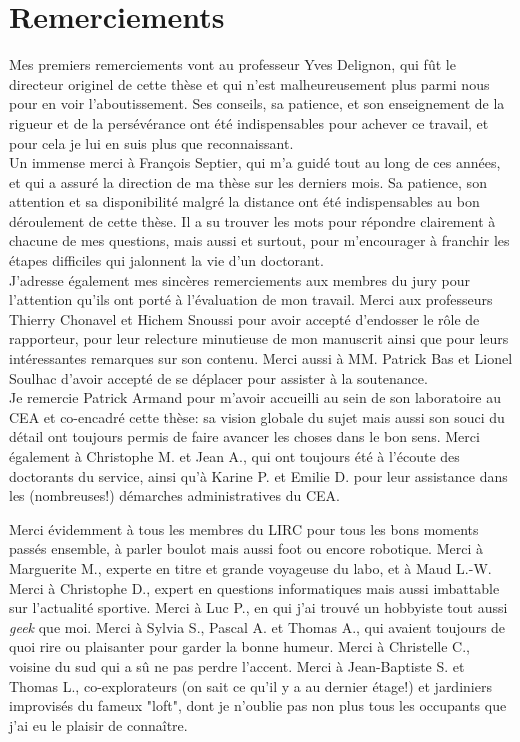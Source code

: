 

\pagestyle{plain}


\section*{Remerciements}
{\small 
Mes premiers remerciements vont au professeur Yves Delignon, qui fût le directeur originel de cette thèse et qui n'est malheureusement plus parmi nous pour en voir l'aboutissement. Ses conseils, sa patience, et son enseignement de la rigueur et de la persévérance ont été indispensables pour achever ce travail, et pour cela je lui en suis plus que reconnaissant. \\

Un immense merci à François Septier, qui m'a guidé tout au long de ces années, et qui a assuré la direction de ma thèse sur les derniers mois. Sa patience, son attention et sa disponibilité malgré la distance ont été indispensables au bon déroulement de cette thèse. Il a su trouver les mots pour répondre clairement à chacune de mes questions, mais aussi et surtout, pour m'encourager à franchir les étapes difficiles qui jalonnent la vie d'un doctorant. \\

J'adresse également mes sincères remerciements aux membres du jury pour l'attention qu'ils ont porté à l'évaluation de mon travail. Merci aux professeurs Thierry Chonavel et Hichem Snoussi pour avoir accepté d'endosser le rôle de rapporteur, pour leur relecture minutieuse de mon manuscrit ainsi que pour leurs intéressantes remarques sur son contenu. Merci aussi à MM. Patrick Bas et Lionel Soulhac d'avoir accepté de se déplacer pour assister à la soutenance. \\

Je remercie Patrick Armand pour m'avoir accueilli au sein de son laboratoire au CEA et co-encadré cette thèse: sa vision globale du sujet mais aussi son souci du détail ont toujours permis de faire avancer les choses dans le bon sens. Merci également à Christophe M.  et Jean A., qui ont toujours été à l'écoute des doctorants du service, ainsi qu'à Karine P. et Emilie D. pour leur assistance dans les (nombreuses!) démarches administratives du CEA.

 Merci évidemment à tous les membres du LIRC pour tous les bons moments passés ensemble, à parler boulot mais aussi foot ou encore robotique. Merci à Marguerite M., experte en titre et grande voyageuse du labo, et à Maud L.-W. Merci à Christophe D., expert en questions informatiques mais aussi imbattable sur l'actualité sportive. Merci à Luc P., en qui j'ai trouvé un hobbyiste tout aussi \textit{geek} que moi. Merci à Sylvia S., Pascal A. et Thomas A., qui avaient toujours de quoi rire ou plaisanter pour garder la bonne humeur. Merci à Christelle C., voisine du sud qui a sû ne pas perdre l'accent. Merci à Jean-Baptiste S. et Thomas L., co-explorateurs (on sait ce qu'il y a au dernier étage!) et jardiniers improvisés du fameux "loft", dont je n'oublie pas non plus tous les occupants que j'ai eu le plaisir de connaître.
 

}
